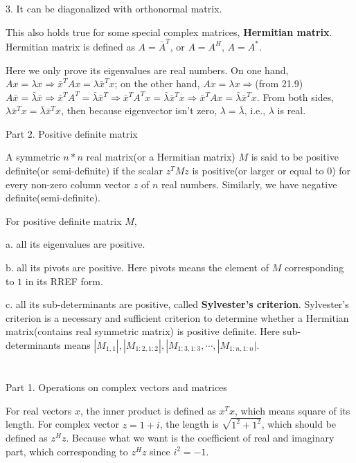 \documentclass{article}
\begin{document}
\begin{spacing}{1.5}
\hspace*{0.5cm}3. It can be diagonalized with orthonormal matrix.

This also holds true for some special complex matrices, {\bfseries Hermitian matrix}. Hermitian matrix is defined as $A=\bar A^T$, or $A=A^H$, $A=A^*$.

Here we only prove its eigenvalues are real numbers. On one hand, $Ax=\lambda x \Rightarrow \bar x^T Ax=\lambda \bar x^T x$; on the other hand, $Ax=\lambda x \Rightarrow$(from 21.9)$ A\bar x=\bar\lambda \bar x \Rightarrow \bar x^T A^T=\bar\lambda \bar x^T \Rightarrow \bar x^T A^T x=\bar\lambda \bar x^T x \Rightarrow \bar x^T A x=\bar\lambda \bar x^T x$. From both sides, $\lambda \bar x^T x = \bar\lambda \bar x^T x$, then because eigenvector isn't zero, $\lambda = \bar\lambda$, i.e., $\lambda$ is real.



Part 2. Positive definite matrix

A symmetric $n * n$ real matrix(or a Hermitian matrix) $M$ is said to be positive definite(or semi-definite) if the scalar $z^T Mz$ is positive(or larger or equal to 0) for every non-zero column vector $z$ of $n$ real numbers. Similarly, we have negative definite(semi-definite).

For positive definite matrix $M$,

a. all its eigenvalues are positive.

b. all its pivots are positive. Here pivots means the element of $M$ corresponding to $1$ in its RREF form.

c. all its sub-determinants are positive, called {\bfseries Sylvester's criterion}. Sylvester’s criterion is a necessary and sufficient criterion to determine whether a Hermitian matrix(contains real symmetric matrix) is positive definite. Here sub-determinants means $|M_{1, 1}|, |M_{1:2, 1:2}|, |M_{1:3, 1:3}, \cdots, |M_{1:n, 1:n}|$.


\section{}
Part 1. Operations on complex vectors and matrices

For real vectors $x$, the inner product is defined as $x^Tx$, which means square of its length. For complex vector $z=1+i$, the length is $\sqrt{1^2+1^2}$, which should be defined as $z^Hz$. Because what we want is the coefficient of real and imaginary part, which corresponding to $z^Hz$ since $i^2=-1$.


\end{spacing}
\end{document}
